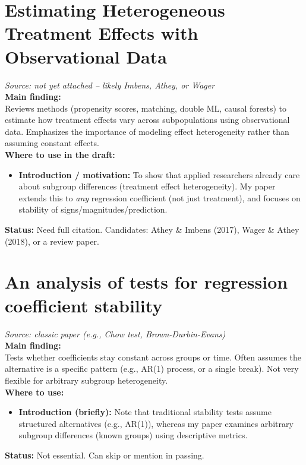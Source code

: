 \documentclass[11pt]{article}
\begin{document}
\section{Estimating Heterogeneous Treatment Effects with Observational Data}
\textit{Source: not yet attached – likely Imbens, Athey, or Wager} \\
\textbf{Main finding:} \\
Reviews methods (propensity scores, matching, double ML, causal forests) to estimate how treatment effects vary across subpopulations using observational data. Emphasizes the importance of modeling effect heterogeneity rather than assuming constant effects. \\
\textbf{Where to use in the draft:}
\begin{itemize}
    \item \textbf{Introduction / motivation:} To show that applied researchers already care about subgroup differences (treatment effect heterogeneity). My paper extends this to \emph{any} regression coefficient (not just treatment), and focuses on stability of signs/magnitudes/prediction.
\end{itemize}
\textbf{Status:} Need full citation. Candidates: Athey \& Imbens (2017), Wager \& Athey (2018), or a review paper.

\section{An analysis of tests for regression coefficient stability}
\textit{Source: classic paper (e.g., Chow test, Brown-Durbin-Evans)} \\
\textbf{Main finding:} \\
Tests whether coefficients stay constant across groups or time. Often assumes the alternative is a specific pattern (e.g., AR(1) process, or a single break). Not very flexible for arbitrary subgroup heterogeneity. \\
\textbf{Where to use:}
\begin{itemize}
    \item \textbf{Introduction (briefly):} Note that traditional stability tests assume structured alternatives (e.g., AR(1)), whereas my paper examines arbitrary subgroup differences (known groups) using descriptive metrics.
\end{itemize}
\textbf{Status:} Not essential. Can skip or mention in passing.
\end{document}
